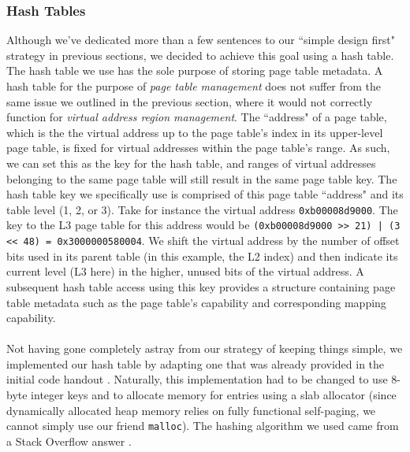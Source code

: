 \subsubsection{Hash Tables}
Although we've dedicated more than a few sentences to our ``simple design first" strategy in previous sections, we decided to achieve this goal using a hash table. The hash table we use has the sole purpose of storing page table metadata. A hash table for the purpose of \textit{page table management} does not suffer from the same issue we outlined in the previous section, where it would not correctly function for \textit{virtual address region management}. The ``address" of a page table, which is the the virtual address up to the page table's index in its upper-level page table, is fixed for virtual addresses within the page table's range. As such, we can set this as the key for the hash table, and ranges of virtual addresses belonging to the same page table will still result in the same page table key.
The hash table key we specifically use is comprised of this page table ``address" and its table level (1, 2, or 3). Take for instance the virtual address \texttt{0xb00008d9000}. The key to the L3 page table for this address would be \texttt{(0xb00008d9000 >> 21) | (3 << 48) = 0x3000000580004}. We shift the virtual address by the number of offset bits used in its parent table (in this example, the L2 index) and then indicate its current level (L3 here) in the higher, unused bits of the virtual address. A subsequent hash table access using this key provides a structure containing page table metadata such as the page table's capability and corresponding mapping capability.
\\\\
Not having gone completely astray from our strategy of keeping things simple, we implemented our hash table by adapting one that was already provided in the initial code handout \cite{bfsource}. Naturally, this implementation had to be changed to use 8-byte integer keys and to allocate memory for entries using a slab allocator (since dynamically allocated heap memory relies on fully functional self-paging, we cannot simply use our friend \texttt{malloc}). The hashing algorithm we used came from a Stack Overflow answer \cite{stackoverflowht}.
\\\\
